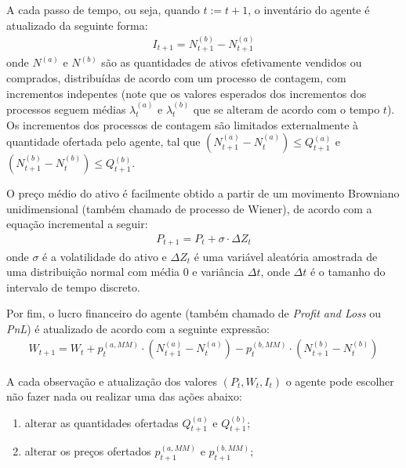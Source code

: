 A cada passo de tempo, ou seja, quando $t := t + 1$, o inventário do agente é atualizado da seguinte forma:
\begin{equation}
    \begin{aligned}
    	I_{t + 1} = N^{(b)}_{t + 1} - N^{(a)}_{t + 1} 
    \end{aligned}
\end{equation}
onde $N^{(a)}$ e $N^{(b)}$ são as quantidades de ativos efetivamente vendidos ou comprados, distribuídas de acordo com um processo de contagem, com incrementos indepentes (note que os valores esperados dos incrementos dos processos seguem médias $\lambda_{t}^{(a)}$ e $\lambda_{t}^{(b)}$ que se alteram de acordo com o tempo $t$). Os incrementos dos processos de contagem são limitados externalmente à quantidade ofertada pelo agente, tal que $(N_{t + 1}^{(a)} - N_{t}^{(a)}) \leq Q_{t + 1}^{(a)}$ e $(N_{t + 1}^{(b)} - N_{t}^{(b)}) \leq Q_{t + 1}^{(b)}$.

O preço médio do ativo é facilmente obtido a partir de um movimento Browniano unidimensional (também chamado de processo de Wiener), de acordo com a equação incremental a seguir:
\begin{equation}
	\begin{aligned}
		P_{t+1} = P_t + \sigma \cdot \Delta Z_t
	\end{aligned}
\end{equation}
onde \(\sigma\) é a volatilidade do ativo e \(\Delta Z_t\) é uma variável aleatória amostrada de uma distribuição normal com média 0 e variância \(\Delta t\), onde \(\Delta t\) é o tamanho do intervalo de tempo discreto.

Por fim, o lucro financeiro do agente (também chamado de \textit{Profit and Loss} ou \textit{PnL}) é atualizado de acordo com a seguinte expressão:
\begin{equation}
	\begin{aligned}
		W_{t + 1} = W_{t} + p^{(a, MM)}_{t} \cdot (N^{(a)}_{t + 1} - N^{(a)}_{t}) - p^{(b, MM)}_{t} \cdot (N^{(b)}_{t + 1} - N^{(b)}_{t} )
	\end{aligned}
\end{equation}

A cada observação e atualização dos valores $(P_{t}, W_{t}, I_{t})$ o agente pode escolher não fazer nada ou realizar uma das ações abaixo:
\begin{enumerate}
    \item alterar as quantidades ofertadas $Q^{(a)}_{t + 1}$ e $Q^{(b)}_{t + 1}$;
    \item alterar os preços ofertados $p^{(a, MM)}_{t + 1}$ e $p^{(b, MM)}_{t + 1}$;
\end{enumerate}

